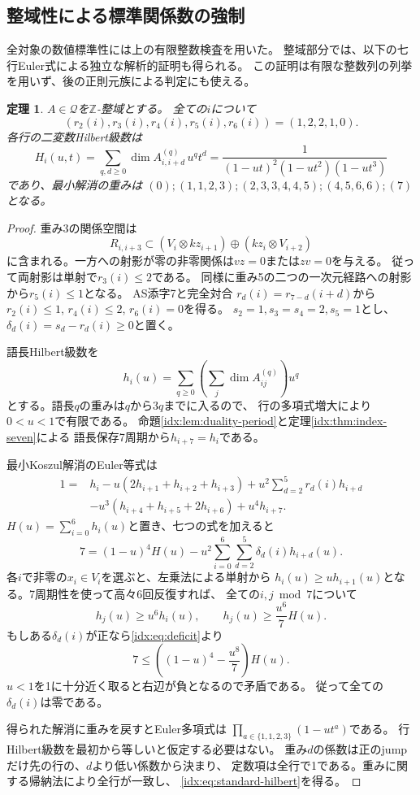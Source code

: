 \documentclass[11pt,a4paper]{ltjsarticle}
\newtheorem{theorem}{定理}[section]
\theoremstyle{definition}
\begin{document}
\subsection{整域性による標準関係数の強制}
全対象の数値標準性には上の有限整数検査を用いた。
整域部分では、以下の七行Euler式による独立な解析的証明も得られる。
この証明は有限な整数列の列挙を用いず、後の正則元族による判定にも使える。
\begin{theorem}\label{idx:thm:domain-standard}
$A\in\mathcal Q$を$\mathbb Z$-整域とする。
全ての$i$について
\[
(r_2(i),r_3(i),r_4(i),r_5(i),r_6(i))=(1,2,2,1,0).
\]
各行の二変数Hilbert級数は
\begin{equation}\label{idx:eq:standard-hilbert}
H_i(u,t)=\sum_{q,d\ge0}\dim A^{(q)}_{i,i+d}\,u^qt^d
=\frac1{(1-ut)^2(1-ut^2)(1-ut^3)}
\end{equation}
であり、最小解消の重みは
$(0);(1,1,2,3);(2,3,3,4,4,5);(4,5,6,6);(7)$となる。
\end{theorem}
\begin{proof}
重み3の関係空間は
\[
R_{i,i+3}\subset
(V_i\otimes kz_{i+1})\oplus(kz_i\otimes V_{i+2})
\]
に含まれる。一方への射影が零の非零関係は$vz=0$または$zv=0$を与える。
従って両射影は単射で$r_3(i)\le2$である。
同様に重み5の二つの一次元経路への射影から$r_5(i)\le1$となる。
AS添字7と完全対合
$r_d(i)=r_{7-d}(i+d)$から$r_2(i)\le1$, $r_4(i)\le2$, $r_6(i)=0$を得る。
$s_2=1,s_3=s_4=2,s_5=1$とし、
$\delta_d(i)=s_d-r_d(i)\ge0$と置く。

語長Hilbert級数を
\[
h_i(u)=\sum_{q\ge0}\left(\sum_j\dim A^{(q)}_{ij}\right)u^q
\]
とする。語長$q$の重みは$q$から$3q$までに入るので、
行の多項式増大により$0<u<1$で有限である。
命題\ref{idx:lem:duality-period}と定理\ref{idx:thm:index-seven}による
語長保存7周期から$h_{i+7}=h_i$である。

最小Koszul解消のEuler等式は
\begin{align*}
1={}&h_i-u(2h_{i+1}+h_{i+2}+h_{i+3})
+u^2\sum_{d=2}^5r_d(i)h_{i+d}\\
&-u^3(h_{i+4}+h_{i+5}+2h_{i+6})+u^4h_{i+7}.
\end{align*}
$H(u)=\sum_{i=0}^6h_i(u)$と置き、七つの式を加えると
\begin{equation}\label{idx:eq:deficit}
7=(1-u)^4H(u)
-u^2\sum_{i=0}^6\sum_{d=2}^5\delta_d(i)h_{i+d}(u).
\end{equation}
各$i$で非零の$x_i\in V_i$を選ぶと、左乗法による単射から
$h_i(u)\ge u h_{i+1}(u)$となる。7周期性を使って高々6回反復すれば、
全ての$i,j\bmod7$について
\[
h_j(u)\ge u^6h_i(u),\qquad h_j(u)\ge\frac{u^6}{7}H(u).
\]
もしある$\delta_d(i)$が正なら\eqref{idx:eq:deficit}より
\[
7\le\left((1-u)^4-\frac{u^8}{7}\right)H(u).
\]
$u<1$を1に十分近く取ると右辺が負となるので矛盾である。
従って全ての$\delta_d(i)$は零である。

得られた解消に重みを戻すとEuler多項式は
$\prod_{a\in\{1,1,2,3\}}(1-ut^a)$である。
行Hilbert級数を最初から等しいと仮定する必要はない。
重み$d$の係数は正のjumpだけ先の行の、$d$より低い係数から決まり、
定数項は全行で1である。重みに関する帰納法により全行が一致し、
\eqref{idx:eq:standard-hilbert}を得る。
\end{proof}
\end{document}
